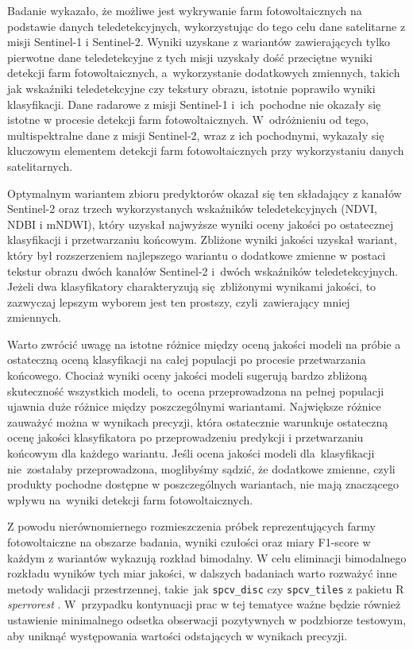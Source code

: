 \documentclass{amuthesis}
\begin{document}
Badanie wykazało, że możliwe jest wykrywanie farm fotowoltaicznych na
podstawie danych teledetekcyjnych, wykorzystując do tego celu dane
satelitarne z misji Sentinel-1 i Sentinel-2. Wyniki uzyskane z wariantów
zawierających tylko pierwotne dane teledetekcyjne z tych misji uzyskały
dość przeciętne wyniki detekcji farm fotowoltaicznych, a~wykorzystanie
dodatkowych zmiennych, takich jak wskaźniki teledetekcyjne czy tekstury
obrazu, istotnie poprawiło wyniki klasyfikacji. Dane radarowe z misji
Sentinel-1 i~ich~pochodne nie okazały się istotne w procesie detekcji
farm fotowoltaicznych. W~odróżnieniu od tego, multispektralne dane z
misji Sentinel-2, wraz z ich pochodnymi, wykazały się kluczowym
elementem detekcji farm fotowoltaicznych przy wykorzystaniu danych
satelitarnych.

Optymalnym wariantem zbioru predyktorów okazał się ten składający z
kanałów Sentinel-2 oraz trzech wykorzystanych wskaźników
teledetekcyjnych (NDVI, NDBI i mNDWI), który uzyskał najwyższe wyniki
oceny jakości po ostatecznej klasyfikacji i przetwarzaniu końcowym.
Zbliżone wyniki jakości uzyskał wariant, który był rozszerzeniem
najlepszego wariantu o dodatkowe zmienne w postaci tekstur obrazu dwóch
kanałów Sentinel-2 i~dwóch wskaźników teledetekcyjnych. Jeżeli dwa
klasyfikatory charakteryzują się~zbliżonymi wynikami jakości, to
zazwyczaj lepszym wyborem jest ten prostszy, czyli~zawierający mniej
zmiennych.

Warto zwrócić uwagę na istotne różnice między oceną jakości modeli na
próbie a ostateczną oceną klasyfikacji na całej populacji po procesie
przetwarzania końcowego. Chociaż wyniki oceny jakości modeli sugerują
bardzo zbliżoną skuteczność wszystkich modeli, to~ocena przeprowadzona
na pełnej populacji ujawnia duże różnice między poszczególnymi
wariantami. Największe różnice zauważyć można w wynikach precyzji, która
ostatecznie warunkuje ostateczną ocenę jakości klasyfikatora po
przeprowadzeniu predykcji i przetwarzaniu końcowym dla każdego wariantu.
Jeśli ocena jakości modeli dla~klasyfikacji nie~zostałaby
przeprowadzona, moglibyśmy sądzić, że dodatkowe zmienne, czyli produkty
pochodne dostępne w poszczególnych wariantach, nie mają znaczącego
wpływu na~wyniki detekcji farm fotowoltaicznych.

Z powodu nierównomiernego rozmieszczenia próbek reprezentujących farmy
fotowoltaiczne na obszarze badania, wyniki czułości oraz miary F1-score
w każdym z wariantów wykazują rozkład bimodalny. W celu eliminacji
bimodalnego rozkładu wyników tych miar jakości, w dalszych badaniach
warto rozważyć inne metody walidacji przestrzennej, takie~jak
\texttt{spcv\_disc} czy \texttt{spcv\_tiles} z pakietu R
\emph{sperrorest} \autocite{R-sperrorest}. W~przypadku kontynuacji prac
w tej tematyce ważne będzie również ustawienie minimalnego odsetka
obserwacji pozytywnych w podzbiorze testowym, aby uniknąć występowania
wartości odstających w wynikach precyzji.
\end{document}
